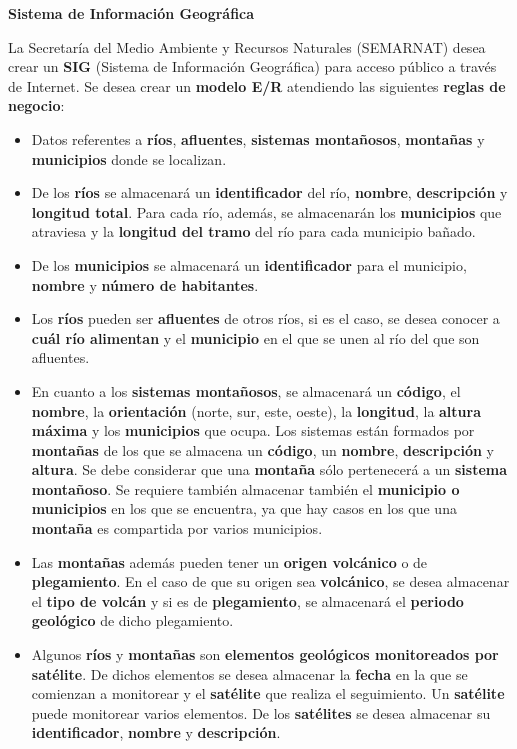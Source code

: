 \item \textbf{Sistema de Información Geográfica}

La Secretaría del Medio Ambiente y Recursos Naturales (SEMARNAT) desea crear un \textbf{SIG} (Sistema de Información Geográfica) para acceso público a través de Internet. Se desea crear un \textbf{modelo E/R} atendiendo las siguientes \textbf{reglas de negocio}:

\begin{itemize}
	\item Datos referentes a \textbf{ríos}, \textbf{afluentes}, \textbf{sistemas montañosos}, \textbf{montañas} y \textbf{municipios} donde se localizan.
	\item De los \textbf{ríos} se almacenará un \textbf{identificador} del río, \textbf{nombre}, \textbf{descripción} y \textbf{longitud total}. Para cada río, además, se almacenarán los \textbf{municipios} que atraviesa y la \textbf{longitud del tramo} del río para cada municipio bañado.
	\item De los \textbf{municipios} se almacenará un \textbf{identificador} para el municipio, \textbf{nombre} y \textbf{número de habitantes}.
	\item Los \textbf{ríos} pueden ser \textbf{afluentes} de otros ríos, si es el caso, se desea conocer a \textbf{cuál río alimentan} y el \textbf{municipio} en el que se unen al río del que son afluentes.
	\item En cuanto a los \textbf{sistemas montañosos}, se almacenará un \textbf{código}, el \textbf{nombre}, la \textbf{orientación} (norte, sur, este, oeste), la \textbf{longitud}, la \textbf{altura máxima} y los \textbf{municipios} que ocupa. Los sistemas están formados por \textbf{montañas} de los que se almacena un \textbf{código}, un \textbf{nombre}, \textbf{descripción} y \textbf{altura}. Se debe considerar que una \textbf{montaña} sólo pertenecerá a un \textbf{sistema montañoso}. Se requiere también almacenar también el \textbf{municipio o municipios} en los que se encuentra, ya que hay casos en los que una \textbf{montaña} es compartida por varios municipios.
	\item Las \textbf{montañas} además pueden tener un \textbf{origen volcánico} o de \textbf{plegamiento}. En el caso de que su origen sea \textbf{volcánico}, se desea almacenar el \textbf{tipo de volcán} y si es de \textbf{plegamiento}, se almacenará el \textbf{periodo geológico} de dicho plegamiento.
	\item Algunos \textbf{ríos} y \textbf{montañas} son \textbf{elementos geológicos monitoreados por satélite}. De dichos elementos se desea almacenar la \textbf{fecha} en la que se comienzan a monitorear y el \textbf{satélite} que realiza el seguimiento. Un \textbf{satélite} puede monitorear varios elementos. De los \textbf{satélites} se desea almacenar su \textbf{identificador}, \textbf{nombre} y \textbf{descripción}.
\end{itemize}

